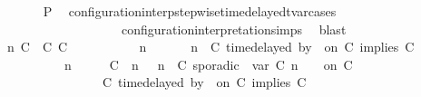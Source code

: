 \begin{isabellebody}
\ \ \ \ \ \ \isamarkupfalse%
\ {\isacharquery}P\ \isamarkupfalse%
\ configuration{\isacharunderscore}interp{\isacharunderscore}stepwise{\isacharunderscore}timedelayed{\isacharunderscore}tvar{\isacharunderscore}cases\isanewline
\ \ \ \ \ \ \ \ \ \ \ \ \ \ \ \ \ \ \ \ configuration{\isacharunderscore}interpretation{\isachardot}simps\ \isamarkupfalse%
\ blast\isanewline
\ \ \ \ \isamarkupfalse%
\isanewline
\ \ \ \ \ \ \isamarkupfalse%
\ {\isasymGamma}\ n\ C\ {\isasymdelta}{\isasymtau}\ C\ C\ {\isasymPsi}\ {\isasymPhi}\isanewline
\ \ \ \ \ \ \isamarkupfalse%
\ {\isacartoucheopen}{\isacharparenleft}{\isasymGamma}\ n\ {\isasymturnstile}\ {\isasymPsi}\ {\isasymtriangleright}\ {\isasymPhi}\ {\isacharequal}\ {\isacharparenleft}{\isasymGamma}{\isacharcomma}\ n\ {\isasymturnstile}\ {\isacharparenleft}C\ time{\isacharminus}delayed{\isasymbowtie}\ by\ {\isasymdelta}{\isasymtau}\ on\ C\ implies\ C\ {\isacharhash}\ {\isasymPsi}\ {\isasymtriangleright}\ {\isasymPhi}{\isacharparenright}{\isacartoucheclose}\isanewline
\ \ \ \ \ \ \ \ \ \ {\isacartoucheopen}{\isacharparenleft}{\isasymGamma}\ n\ {\isasymturnstile}\ {\isasymPsi}\ {\isasymtriangleright}\ {\isasymPhi}\ {\isacharequal}\ {\isacharparenleft}{\isacharparenleft}{\isacharparenleft}C\ {\isasymUp}\ n{\isacharparenright}\ {\isacharhash}\ {\isasymGamma}{\isacharparenright}{\isacharcomma}\ n\ {\isasymturnstile}\ {\isacharparenleft}C\ sporadic{\isasymsharp}\ {\isasymlparr}\ {\isasymtau}\isactrlsub v\isactrlsub a\isactrlsub r\ {\isacharparenleft}C\ n{\isacharparenright}\ {\isasymoplus}\ {\isasymdelta}{\isasymtau}\ {\isasymrparr}\ on\ C\ {\isacharhash}\isanewline
\ \ \ \ \ \ \ \ \ \ \ \ \ \ \ {\isasymPsi}\ {\isasymtriangleright}\ {\isacharparenleft}{\isacharparenleft}C\ time{\isacharminus}delayed{\isasymbowtie}\ by\ {\isasymdelta}{\isasymtau}\ on\ C\ implies\ C\ {\isacharhash}\ {\isasymPhi}{\isacharparenright}{\isacharparenright}{\isacartoucheclose}\isanewline

\end{isabellebody}

